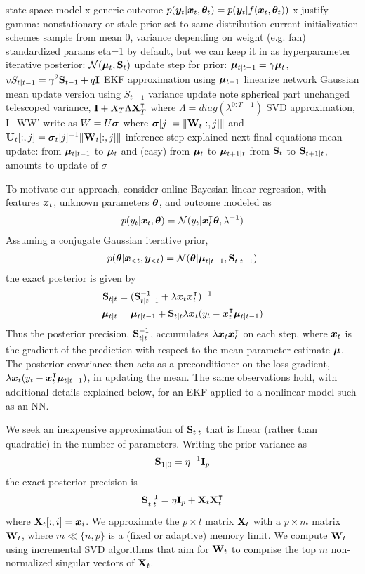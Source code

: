 state-space model
 x generic outcome $p({\bm{y}}_t\vert {\bm{x}}_t,{\bm{\theta}}_t) = p({\bm{y}}_t\vert f({\bm{x}}_t,{\bm{\theta}}_t))$
 x justify gamma: nonstationary or stale
prior set to same distribution current initialization schemes sample from
 mean 0, variance depending on weight (e.g. fan)
 standardized params
 eta=1 by default, but we can keep it in as hyperparameter
iterative posterior: $\mathcal{N}(\boldsymbol{\mu}_t,\mathbf{S}_t)$
update step for prior: $\boldsymbol{\mu}_{t\vert t-1}=\gamma\boldsymbol{\mu}_t$, $vS_{t\vert t-1}=\gamma^2\mathbf{S}_{t-1}+q\mathbf{I}$
EKF approximation using $\boldsymbol{\mu}_{t-1}$
 linearize network
 Gaussian 
mean update
 version using $S_{t-1}$
variance update
 note spherical part unchanged
telescoped variance, $\mathbf{I}+X_T\Lambda \mathbf{X}_T^\intercal$ where $\Lambda=diag(\lambda^{0:T-1})$
SVD approximation, I+WW'
 write as $W=U\boldsymbol{\sigma}$ where $\boldsymbol{\sigma}[j]=\Vert \mathbf{W}_t[:,j]\Vert$ and $\mathbf{U}_t[:,j]=\boldsymbol{\sigma}_t[j]^{-1}\Vert \mathbf{W}_t[:,j]\Vert$
 inference step explained next
final equations
 mean update: from $\boldsymbol{\mu}_{t\vert t-1}$ to $\boldsymbol{\mu}_t$ and (easy) from $\boldsymbol{\mu}_t$ to $\boldsymbol{\mu}_{t+1\vert t}$
 from $\mathbf{S}_t$ to $\mathbf{S}_{t+1\vert t}$, amounts to update of $\sigma$


To motivate our approach, consider online Bayesian linear regression, with features ${\bm{x}}_t$, unknown parameters ${\bm{\theta}}$, and outcome modeled as
\begin{align}
    p(y_t|{\bm{x}}_t,{\bm{\theta}}) = \mathcal{N}(y_t|{\bm{x}}_t^\intercal{\bm{\theta}},\lambda^{-1})
\end{align}
Assuming a conjugate Gaussian iterative prior,
\begin{align}
    p({\bm{\theta}}|{\bm{x}}_{<t},{\bm{y}}_{<t}) = \mathcal{N}({\bm{\theta}}|\boldsymbol{\mu}_{t|t-1},\mathbf{S}_{t|t-1})
\end{align}
the exact posterior is given by
\begin{align}
    \mathbf{S}_{t|t} &= (\mathbf{S}_{t|t-1}^{-1} + \lambda{\bm{x}}_t{\bm{x}}_t^\intercal)^{-1} \\
    \boldsymbol{\mu}_{t|t} &= \boldsymbol{\mu}_{t|t-1} + \mathbf{S}_{t|t}\lambda{\bm{x}}_t (y_t-{\bm{x}}_t^\intercal\boldsymbol{\mu}_{t|t-1})
\end{align}
Thus the posterior precision, $\mathbf{S}_{t|t}^{-1}$, accumulates $\lambda{\bm{x}}_t{\bm{x}}_t^\intercal$ on each step, where ${\bm{x}}_t$ is the gradient of the prediction with respect to the mean parameter estimate $\boldsymbol{\mu}$. The posterior covariance then acts as a preconditioner on the loss gradient, $\lambda{\bm{x}}_t (y_t-{\bm{x}}_t^\intercal\boldsymbol{\mu}_{t|t-1})$, in updating the mean. The same observations hold, with additional details explained below, for an EKF applied to a nonlinear model such as an NN.

We seek an inexpensive approximation of $\mathbf{S}_{t|t}$ that is linear (rather than quadratic) in the number of parameters. Writing the prior variance as 
\begin{align}
    \mathbf{S}_{1|0} = \eta^{-1}\mathbf{I}_p
\end{align}
the exact posterior precision is
\begin{align}
    \mathbf{S}_{t|t}^{-1} = \eta\mathbf{I}_p + \mathbf{X}_t\mathbf{X}_t^\intercal
\end{align}
where $\mathbf{X}_t[:,i]={\bm{x}}_i$. We approximate the $p\times t$ matrix $\mathbf{X}_t$ with a $p\times m$ matrix $\mathbf{W}_t$, where $m\ll \{n,p\}$ is a (fixed or adaptive) memory limit. We compute $\mathbf{W}_t$ using incremental SVD algorithms that aim for $\mathbf{W}_t$ to comprise the top $m$ non-normalized singular vectors of $\mathbf{X}_t$.


